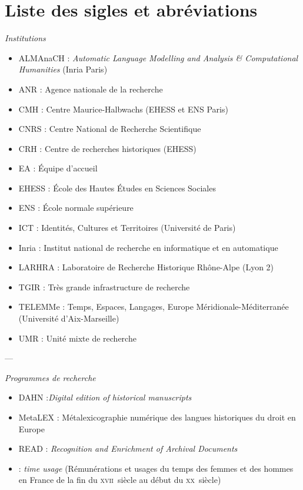 \chapter*{Liste des sigles et abréviations}

\begin{center}
\textit{Institutions}
\end{center} 

\begin{itemize}
    \item ALMAnaCH : \textit{Automatic Language Modelling and Analysis \& Computational Humanities} (Inria Paris)
    \item ANR : Agence nationale de la recherche
    \item CMH : Centre Maurice-Halbwachs (EHESS et ENS Paris)
    \item CNRS : Centre National de Recherche Scientifique
    \item CRH : Centre de recherches historiques (EHESS)
    \item EA : Équipe d'accueil
    \item EHESS : École des Hautes Études en Sciences Sociales
    \item ENS : École normale supérieure
    \item ICT : Identités, Cultures et Territoires (Université de Paris)
    \item Inria : Institut national de recherche en informatique et en automatique
    \item LARHRA : Laboratoire de Recherche Historique Rhône-Alpe (Lyon 2)
    \item TGIR : Très grande infrastructure de recherche
    \item TELEMMe : Temps, Espaces, Langages, Europe Méridionale-Méditerranée (Université d’Aix-Marseille)
    \item UMR : Unité mixte de recherche
\end{itemize}

\bigbreak

\begin{center}---

\bigbreak

\textit{Programmes de recherche}
\end{center} 

\begin{itemize}
    \item DAHN :\textit{Digital edition of historical manuscripts}
    \item MetaLEX : Métalexicographie numérique des langues historiques du
droit en Europe
    \item READ : \textit{Recognition and Enrichment of Archival Documents}
    \item \timeus{} :\textit{ time usage} (Rémunérations et usages du temps des femmes et des hommes en France de la fin du \textsc{xvii}\ieme ~siècle au début du \textsc{xx}\ieme ~siècle)
\end{itemize}

